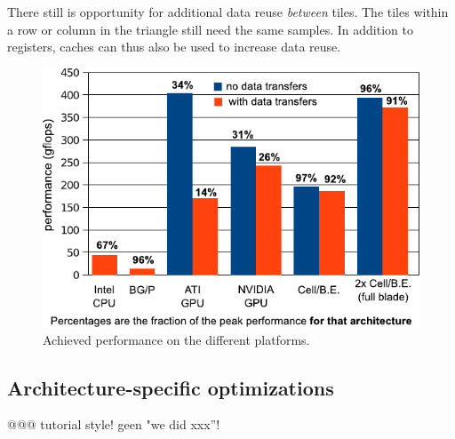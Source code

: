 \documentclass{article}
\begin{document}

There still is
opportunity for additional data reuse \emph{between} tiles.  The tiles
within a row or column in the triangle still need the same samples.
In addition to registers, caches can thus also be used to increase
data reuse. 



\begin{figure}[t]
\begin{center}
\includegraphics[width=\columnwidth]{figures/performance-graph-v2.pdf}
\end{center}
\vspace{-0.5cm}
\caption{Achieved performance on the different platforms.}
\label{performance-graph}
\end{figure}



\subsection{Architecture-specific optimizations}
\label{sec:architecture-optimizations}

@@@ tutorial style! geen "we did xxx''!
\end{document}
